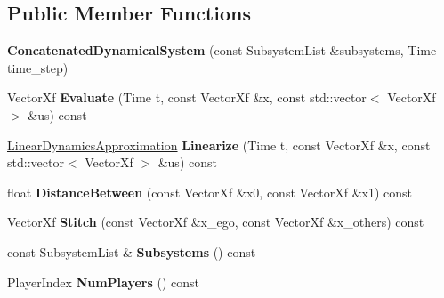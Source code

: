 \subsection*{Public Member Functions}
\begin{DoxyCompactItemize}
\item 
{\bfseries Concatenated\+Dynamical\+System} (const Subsystem\+List \&subsystems, Time time\+\_\+step)\hypertarget{classilqgames_1_1_concatenated_dynamical_system_afbac1f5e7a0ceaa9b59a0354e959266f}{}\label{classilqgames_1_1_concatenated_dynamical_system_afbac1f5e7a0ceaa9b59a0354e959266f}

\item 
Vector\+Xf {\bfseries Evaluate} (Time t, const Vector\+Xf \&x, const std\+::vector$<$ Vector\+Xf $>$ \&us) const \hypertarget{classilqgames_1_1_concatenated_dynamical_system_aba82e3499a437d6c27c8575f0e749298}{}\label{classilqgames_1_1_concatenated_dynamical_system_aba82e3499a437d6c27c8575f0e749298}

\item 
\hyperlink{structilqgames_1_1_linear_dynamics_approximation}{Linear\+Dynamics\+Approximation} {\bfseries Linearize} (Time t, const Vector\+Xf \&x, const std\+::vector$<$ Vector\+Xf $>$ \&us) const \hypertarget{classilqgames_1_1_concatenated_dynamical_system_a9939297ff3859abc1cf0ad6207783167}{}\label{classilqgames_1_1_concatenated_dynamical_system_a9939297ff3859abc1cf0ad6207783167}

\item 
float {\bfseries Distance\+Between} (const Vector\+Xf \&x0, const Vector\+Xf \&x1) const \hypertarget{classilqgames_1_1_concatenated_dynamical_system_a5d241472286d6f3e49b38c02e47d25f1}{}\label{classilqgames_1_1_concatenated_dynamical_system_a5d241472286d6f3e49b38c02e47d25f1}

\item 
Vector\+Xf {\bfseries Stitch} (const Vector\+Xf \&x\+\_\+ego, const Vector\+Xf \&x\+\_\+others) const \hypertarget{classilqgames_1_1_concatenated_dynamical_system_a81183125fda71b1d57a1630d27f21d98}{}\label{classilqgames_1_1_concatenated_dynamical_system_a81183125fda71b1d57a1630d27f21d98}

\item 
const Subsystem\+List \& {\bfseries Subsystems} () const \hypertarget{classilqgames_1_1_concatenated_dynamical_system_a8556844c77ee4445d47f11a327d19192}{}\label{classilqgames_1_1_concatenated_dynamical_system_a8556844c77ee4445d47f11a327d19192}

\item 
Player\+Index {\bfseries Num\+Players} () const \hypertarget{classilqgames_1_1_concatenated_dynamical_system_a81821c7e9776a45b319f7153bcd93248}{}\label{classilqgames_1_1_concatenated_dynamical_system_a81821c7e9776a45b319f7153bcd93248}


\end{DoxyCompactItemize}
